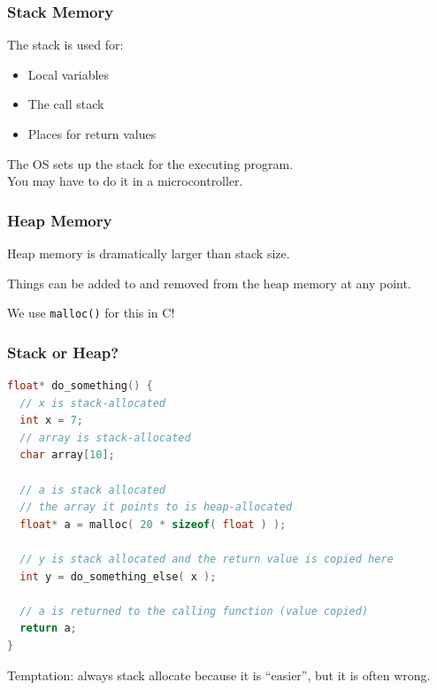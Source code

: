 \begin{frame}
\frametitle{Stack Memory}

The stack is used for:

\begin{itemize}
	\item Local variables
	\item The call stack
	\item Places for return values
\end{itemize}

The OS sets up the stack for the executing program.\\
\quad You may have to do it in a microcontroller.

\end{frame}

\begin{frame}
\frametitle{Heap Memory}

Heap memory is dramatically larger than stack size.

Things can be added to and removed from the heap memory at any point.

We use \texttt{malloc()} for this in C! 

\end{frame}

\begin{frame}[fragile]
\frametitle{Stack or Heap?}

\begin{lstlisting}[language=C]
float* do_something() {
  // x is stack-allocated
  int x = 7; 
  // array is stack-allocated
  char array[10]; 
  
  // a is stack allocated
  // the array it points to is heap-allocated
  float* a = malloc( 20 * sizeof( float ) ); 

  // y is stack allocated and the return value is copied here
  int y = do_something_else( x );

  // a is returned to the calling function (value copied)
  return a;
}
\end{lstlisting}

Temptation: always stack allocate because it is ``easier'', but it is often wrong. 

\end{frame}


